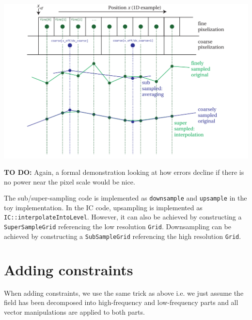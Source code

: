 \documentclass[11pt,a4paper,preprint]{aastex}
\begin{document}
\includegraphics[width=1.0\textwidth]{figs/pixelization-figure.pdf}

{\bf TO DO: } Again, a formal
demonstration looking at how errors decline if there is no power near
the pixel scale would be nice.

The sub/super-sampling code is implemented as {\tt downsample}
and {\tt upsample} in the toy implementation. In the IC code,
upsampling is implemented as {\tt IC::interpolateIntoLevel}.
However, it can also be achieved by constructing a
{\tt SuperSampleGrid} referencing the low resolution {\tt Grid}.
Downsampling can be achieved by constructing a 
{\tt SubSampleGrid} referencing the high resolution {\tt Grid}.


\section{Adding constraints}

When adding constraints, we use the same trick as above i.e. we just assume
the field has been decomposed into high-frequency and low-frequency parts and
all vector manipulations are applied to both parts.
\end{document}
